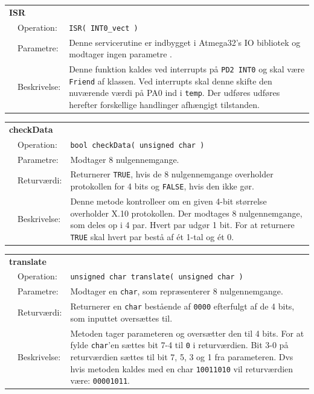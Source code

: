 \begin{table}[h]
\begin{tabularx}{\textwidth}{p{0.6 cm} l X} %
\multicolumn{3}{l}{\textbf{ISR}}\\
& Operation: & %
\texttt{ISR( INT0\_vect )}
\\ & Parametre: & %
Denne servicerutine er indbygget i Atmega32's IO bibliotek og modtager ingen parametre \cite{lib:AtMega32sum}.
\\ & Beskrivelse: & %
Denne funktion kaldes ved interrupts på \texttt{PD2 INT0} og skal være \texttt{Friend} af klassen. Ved interrupts skal denne skifte den nuværende værdi på PA0 ind i \texttt{temp}. Der udføres udføres herefter forskellige handlinger afhængigt tilstanden.
\\
\end{tabularx}
\end{table}

\begin{table}[h]
\begin{tabularx}{\textwidth}{p{0.6 cm} l X} %
\multicolumn{3}{l}{\textbf{checkData}}\\
& Operation: & %
\texttt{bool checkData( unsigned char )}
\\ & Parametre: & %
Modtager 8 nulgennemgange.
\\ & Returværdi: & %
Returnerer \texttt{TRUE}, hvis de 8 nulgennemgange overholder protokollen for 4 bits og \texttt{FALSE}, hvis den ikke gør.
\\ & Beskrivelse: & %
Denne metode kontrolleer om en given 4-bit størrelse overholder X.10 protokollen. Der modtages 8 nulgennemgange, som deles op i 4 par. Hvert par udgør 1 bit. For at returnere \texttt{TRUE} skal hvert par bestå af ét 1-tal og ét 0.
\\
\end{tabularx}
\end{table}

\begin{table}[h]
\begin{tabularx}{\textwidth}{p{0.6 cm} l X} %
\multicolumn{3}{l}{\textbf{translate}}\\
& Operation: & %
\texttt{unsigned char translate( unsigned char )}
\\ & Parametre: & %
Modtager en \texttt{char}, som repræsenterer 8 nulgennemgange.
\\ & Returværdi: & %
Returnerer en \texttt{char} bestående af \texttt{0000} efterfulgt af de 4 bits, som inputtet oversættes til.
\\ & Beskrivelse: & %
Metoden tager parameteren og oversætter den til 4 bits. For at fylde \texttt{char}'en sættes bit 7-4 til \texttt{0} i returværdien. Bit 3-0 på returværdien sættes til bit 7, 5, 3 og 1 fra parameteren. 
Dvs hvis metoden kaldes med en char \texttt{10011010} vil returværdien være: \texttt{00001011}. 
\\
\end{tabularx}
\end{table}

